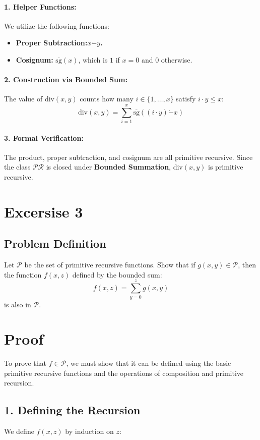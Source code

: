 \documentclass{article}
\begin{document}
\paragraph{1. Helper Functions:}
We utilize the following functions:
\begin{itemize}
    \item \textbf{Proper Subtraction:$x\dot{-}y$.}
    \item \textbf{Cosignum:} $\overline{\text{sg}}(x)$, which is $1$ if $x=0$ and $0$ otherwise.
\end{itemize}

\paragraph{2. Construction via Bounded Sum:}
The value of $\text{div}(x, y)$ counts how many $i \in \{1, \dots, x\}$ satisfy $i \cdot y \leq x$:
\[
\text{div}(x, y) = \sum_{i=1}^{x} \overline{\text{sg}}((i \cdot y) \dot{-} x)
\]

\paragraph{3. Formal Verification:}
The product, proper subtraction, and cosignum are all primitive recursive. Since the class $\mathcal{PR}$ is closed under \textbf{Bounded Summation}, $\text{div}(x, y)$ is primitive recursive.

\section*{Excersise 3}

\subsection{Problem Definition}
Let $\mathcal{P}$ be the set of primitive recursive functions. Show that if $g(x, y) \in \mathcal{P}$, then the function $f(x, z)$ defined by the bounded sum:
\[
f(x, z) = \sum_{y=0}^{z} g(x, y)
\]
is also in $\mathcal{P}$.

\section*{Proof}

To prove that $f \in \mathcal{P}$, we must show that it can be defined using the basic primitive recursive functions and the operations of composition and primitive recursion.

\subsection*{1. Defining the Recursion}
We define $f(x, z)$ by induction on $z$:
\end{document}
